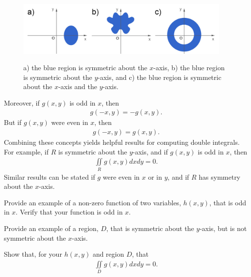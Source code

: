 \documentclass{article}
\begin{document}
\begin{figure}[h]
  \vspace{-1pt}
  \begin{center}
    \includegraphics[width=0.95\textwidth]{ImgRegions.jpg}
  \end{center}
 \begin{quote} \caption{\small{a) the blue region is symmetric about the $x$-axis, b) the blue region is symmetric about the $y$-axis, and c) the blue region is symmetric about the $x$-axis and the $y$-axis.}}\end{quote}
\end{figure}

Moreover, if $g(x,y)$ is odd in $x$, then 
\begin{align*}
  g(-x,y) = - g(x,y).
\end{align*}
But if $g(x,y)$ were even in $x$, then 
\begin{align*}
  g(-x,y) =  g(x,y).
\end{align*}
Combining these concepts yields helpful results for computing double integrals. For example, if $R$ is symmetric about the $y$-axis, and if $g(x,y)$ is odd in $x$, then
\begin{align*}
  \iint\limits_R g(x,y) dxdy = 0.
\end{align*}
Similar results can be stated if $g$ were even in $x$ or in $y$, and if $R$ has symmetry about the $x$-axis. 
\BEN
\item Provide an example of a non-zero function of two variables, $h(x,y)$, that is odd in $x$. Verify that your function is odd in $x$.
\item Provide an example of a region, $D$, that is symmetric about the $y$-axis, but is not symmetric about the $x$-axis. 
\item Show that, for your $h(x,y)$ and region $D$, that 
\begin{align*}
  \iint\limits_D g(x,y) dxdy = 0.
\end{align*}
\EEN

\EEN %


\newpage
\end{document}
